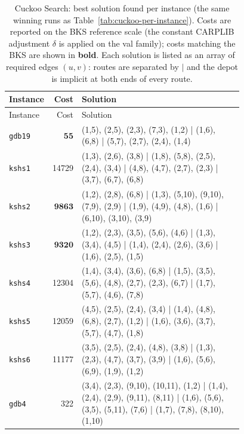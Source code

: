 \begin{landscape}
\begingroup\scriptsize
\begin{longtable}{lr>{\tiny\raggedright\arraybackslash}p{0.78\linewidth}}
\caption{Cuckoo Search: best solution found per instance (the same winning runs as Table~\ref{tab:cuckoo-per-instance}). Costs are reported on the BKS reference scale (the constant CARPLIB adjustment $\delta$ is applied on the val family); costs matching the BKS are shown in \textbf{bold}. Each solution is listed as an array of required edges $(u,v)$: routes are separated by $|$ and the depot is implicit at both ends of every route.}\label{tab:cuckoo-solutions}\\
\toprule
Instance & Cost & Solution \\
\midrule
\endfirsthead
\toprule
Instance & Cost & Solution \\
\midrule
\endhead
\bottomrule
\endfoot
\texttt{gdb19} & $\mathbf{55}$ & (1,5), (2,5), (2,3), (7,3), (1,2) | (1,6), (6,8) | (5,7), (2,7), (2,4), (1,4) \\[2pt]
\texttt{kshs1} & 14729 & (1,3), (2,6), (3,8) | (1,8), (5,8), (2,5), (2,4), (3,4) | (4,8), (4,7), (2,7), (2,3) | (3,7), (6,7), (6,8) \\[2pt]
\texttt{kshs2} & $\mathbf{9863}$ & (1,2), (2,8), (6,8) | (1,3), (5,10), (9,10), (7,9), (2,9) | (1,9), (4,9), (4,8), (1,6) | (6,10), (3,10), (3,9) \\[2pt]
\texttt{kshs3} & $\mathbf{9320}$ & (1,2), (2,3), (3,5), (5,6), (4,6) | (1,3), (3,4), (4,5) | (1,4), (2,4), (2,6), (3,6) | (1,6), (2,5), (1,5) \\[2pt]
\texttt{kshs4} & 12304 & (1,4), (3,4), (3,6), (6,8) | (1,5), (3,5), (5,6), (4,8), (2,7), (2,3), (6,7) | (1,7), (5,7), (4,6), (7,8) \\[2pt]
\texttt{kshs5} & 12059 & (4,5), (2,5), (2,4), (3,4) | (1,4), (4,8), (6,8), (2,7), (1,2) | (1,6), (3,6), (3,7), (5,7), (4,7), (1,8) \\[2pt]
\texttt{kshs6} & 11177 & (3,5), (2,5), (2,4), (4,8), (3,8) | (1,3), (2,3), (4,7), (3,7), (3,9) | (1,6), (5,6), (6,9), (1,9), (1,2) \\[2pt]
\texttt{gdb4} & 322 & (3,4), (2,3), (9,10), (10,11), (1,2) | (1,4), (2,4), (2,9), (9,11), (8,11) | (1,6), (5,6), (3,5), (5,11), (7,6) | (1,7), (7,8), (8,10), (1,10) \\[2pt]

\end{longtable}
\end{landscape}
